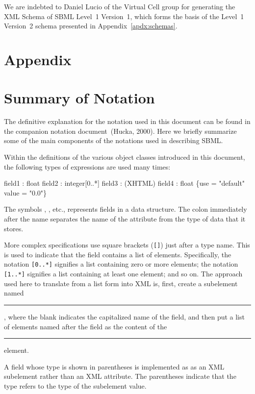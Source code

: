 \documentclass[10pt]{cekarticle}
\begin{document}
We are indebted to Daniel Lucio of the Virtual Cell group for generating
the XML Schema of SBML Level~1 Version~1, which forms the basis of the
Level~1 Version~2 schema presented in Appendix~\ref{apdx:schemas}.


\newpage
\section{Appendix}
\setcounter{secnumdepth}{2}
\appendix
\section{Summary of Notation}
\label{apdx:notation}

The definitive explanation for the notation used in this document can be
found in the companion notation document~(Hucka, 2000).  Here we briefly
summarize some of the main components of the notations used in describing
SBML.

Within the definitions of the various object classes introduced in this
document, the following types of expressions are used many times:

\begin{example}
  field1 : float
  field2 : integer[0..*]
  field3 : (XHTML)
  field4 : float \{use = "default" value = "0.0"\}
\end{example}

The symbols , , etc., represents fields in a
data structure.  The colon immediately after the name separates the name of
the attribute from the type of data that it stores.

More complex specifications use square brackets (\texttt{[]}) just after a
type name.  This is used to indicate that the field contains a list of
elements.  Specifically, the notation \texttt{[0..*]} signifies a list
containing zero or more elements; the notation \texttt{[1..*]} signifies a
list containing at least one element; and so on.  The approach used here to
translate from a list form into XML is, first, create a subelement named
\rule{0.5in}{0.5pt}, where the blank indicates the
capitalized name of the field, and then put a list of elements named after
the field as the content of the \rule{0.5in}{0.5pt}
element.

A field whose type is shown in parentheses is implemented as as an XML
subelement rather than an XML attribute.  The parentheses indicate that the
type refers to the type of the subelement value.
\end{document}
